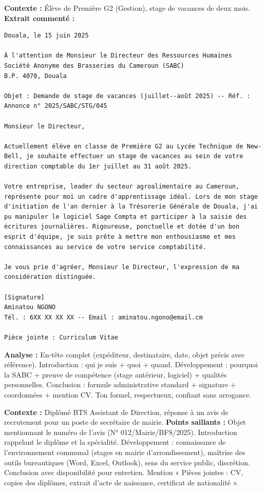 \documentclass[11pt]{article}
\begin{document}
\begin{exemplebox}
\textbf{Contexte :} Élève de Première G2 (Gestion), stage de vacances de deux mois.
\textbf{Extrait commenté :}
\begin{verbatim}
Douala, le 15 juin 2025

À l'attention de Monsieur le Directeur des Ressources Humaines
Société Anonyme des Brasseries du Cameroun (SABC)
B.P. 4070, Douala

Objet : Demande de stage de vacances (juillet--août 2025) -- Réf. : Annonce n° 2025/SABC/STG/045

Monsieur le Directeur,

Actuellement élève en classe de Première G2 au Lycée Technique de New-Bell, je souhaite effectuer un stage de vacances au sein de votre direction comptable du 1er juillet au 31 août 2025.

Votre entreprise, leader du secteur agroalimentaire au Cameroun, représente pour moi un cadre d'apprentissage idéal. Lors de mon stage d'initiation de l'an dernier à la Trésorerie Générale de Douala, j'ai pu manipuler le logiciel Sage Compta et participer à la saisie des écritures journalières. Rigoureuse, ponctuelle et dotée d'un bon esprit d'équipe, je suis prête à mettre mon enthousiasme et mes connaissances au service de votre service comptabilité.

Je vous prie d'agréer, Monsieur le Directeur, l'expression de ma considération distinguée.

[Signature]
Aminatou NGONO
Tél. : 6XX XX XX XX -- Email : aminatou.ngono@email.cm

Pièce jointe : Curriculum Vitae
\end{verbatim}
\textbf{Analyse :} En-tête complet (expéditeur, destinataire, date, objet précis avec référence). Introduction : qui je suis + quoi + quand. Développement : pourquoi la SABC + preuve de compétence (stage antérieur, logiciel) + qualités personnelles. Conclusion : formule administrative standard + signature + coordonnées + mention CV. Ton formel, respectueux, confiant sans arrogance.
\end{exemplebox}

\begin{exemplebox}
\textbf{Contexte :} Diplômé BTS Assistant de Direction, réponse à un avis de recrutement pour un poste de secrétaire de mairie.
\textbf{Points saillants :} Objet mentionnant le numéro de l'avis (N° 012/Mairie/BFS/2025). Introduction rappelant le diplôme et la spécialité. Développement : connaissance de l'environnement communal (stages en mairie d'arrondissement), maîtrise des outils bureautiques (Word, Excel, Outlook), sens du service public, discrétion. Conclusion avec disponibilité pour entretien. Mention « Pièces jointes : CV, copies des diplômes, extrait d'acte de naissance, certificat de nationalité ».
\end{exemplebox}
\end{document}
